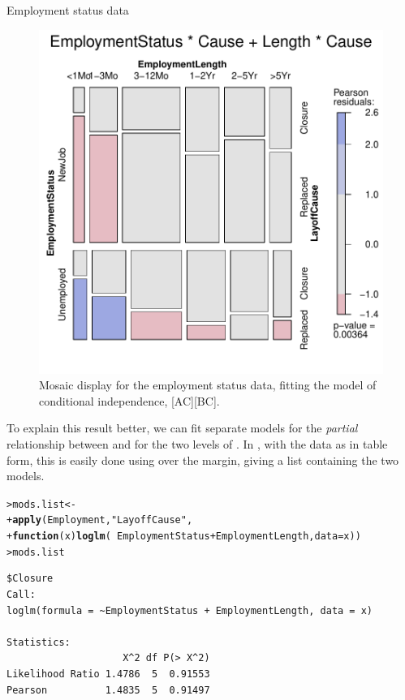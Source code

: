 \documentclass[10pt,krantz2]{krantz}\usepackage[]{graphicx}\usepackage[]{color}
\makeatletter
\newcommand{\hlstr}[1]{\textcolor[rgb]{0.192,0.494,0.8}{#1}}%
\newcommand{\hlopt}[1]{\textcolor[rgb]{0,0,0}{#1}}%
\newcommand{\hlstd}[1]{\textcolor[rgb]{0.345,0.345,0.345}{#1}}%
\newcommand{\hlkwa}[1]{\textcolor[rgb]{0.161,0.373,0.58}{\textbf{#1}}}%
\newcommand{\hlkwb}[1]{\textcolor[rgb]{0.69,0.353,0.396}{#1}}%
\newcommand{\hlkwc}[1]{\textcolor[rgb]{0.333,0.667,0.333}{#1}}%
\newcommand{\hlkwd}[1]{\textcolor[rgb]{0.737,0.353,0.396}{\textbf{#1}}}%
\newenvironment{kframe}{%
 \def\at@end@of@kframe{}%
 \ifinner\ifhmode%
  \def\at@end@of@kframe{\end{minipage}}%
  \begin{minipage}{\columnwidth}%
 \fi\fi%
 \def\FrameCommand##1{\hskip\@totalleftmargin \hskip-\fboxsep
 \colorbox{shadecolor}{##1}\hskip-\fboxsep
     \hskip-\linewidth \hskip-\@totalleftmargin \hskip\columnwidth}%
 \MakeFramed {\advance\hsize-\width
   \@totalleftmargin\z@ \linewidth\hsize
   \@setminipage}}%
 {\par\unskip\endMakeFramed%
 \at@end@of@kframe}
\newenvironment{knitrout}{}{} %
\renewenvironment{knitrout}{\small\renewcommand{\baselinestretch}{.85}}{} %
\makeatother
\begin{document}
\begin{Example}[employ]{Employment status data}
\begin{knitrout}
\begin{figure}[!htbp]
\centerline{\includegraphics[width=.6\textwidth]{ch05/fig/employ-mos2-1} }

\caption[Mosaic display for the employment status data, fitting the model of conditional independence]{Mosaic display for the employment status data, fitting the model of conditional independence, [AC][BC].\label{fig:employ-mos2}}
\end{figure}


\end{knitrout}

To explain this result better, we can fit separate models for the \emph{partial}
relationship between  and 
for the two levels of . In \R, with the  data
as in table form, this is easily done using  over the
 margin, giving a list containing the two  models.

\begin{knitrout}
\color{fgcolor}\begin{kframe}
\begin{alltt}
\hlstd{> }\hlstd{mods.list} \hlkwb{<-}
\hlstd{+ }  \hlkwd{apply}\hlstd{(Employment,} \hlstr{"LayoffCause"}\hlstd{,}
\hlstd{+ }        \hlkwa{function}\hlstd{(}\hlkwc{x}\hlstd{)} \hlkwd{loglm}\hlstd{(}\hlopt{~} \hlstd{EmploymentStatus} \hlopt{+} \hlstd{EmploymentLength,} \hlkwc{data} \hlstd{= x))}
\hlstd{> }\hlstd{mods.list}
\end{alltt}
\begin{verbatim}
$Closure
Call:
loglm(formula = ~EmploymentStatus + EmploymentLength, data = x)

Statistics:
                    X^2 df P(> X^2)
Likelihood Ratio 1.4786  5  0.91553
Pearson          1.4835  5  0.91497


\end{verbatim}
\end{kframe}
\end{knitrout}
\end{Example}
\end{document}
